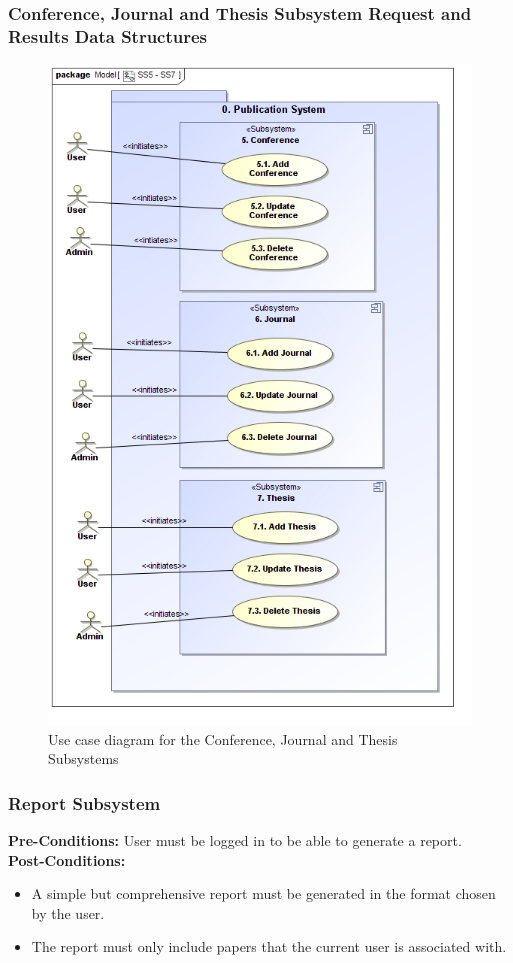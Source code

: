 \documentclass{article}
\begin{document}
			\subsubsection{Conference, Journal and Thesis Subsystem Request and Results Data Structures}
				\begin{figure}
					\includegraphics[width=\textwidth]{SS5-SS7}
					\caption{Use case diagram for the Conference, Journal and Thesis Subsystems}
				\end{figure}
			\subsubsection{Report Subsystem}
				\textbf{Pre-Conditions:} User must be logged in to be able to generate a report.\\
				\textbf{Post-Conditions:}
				\begin{itemize}
					\item A simple but comprehensive report must be generated in the format chosen by the user.
					\item The report must only include papers that the current user is associated with.
				\end{itemize}
				
\end{document}
